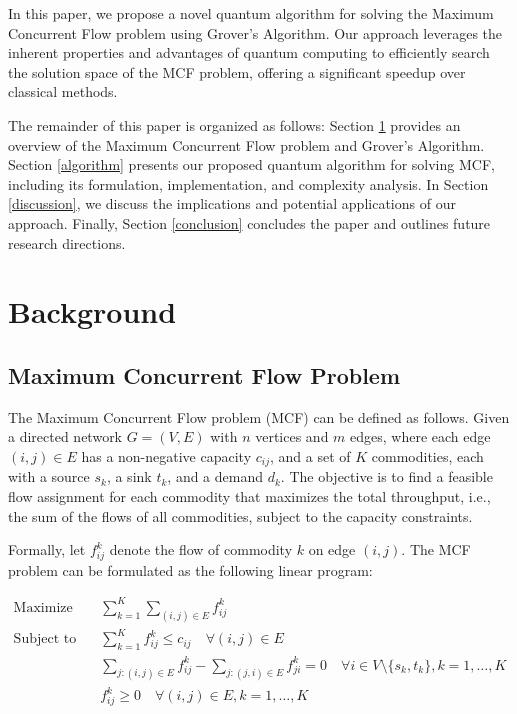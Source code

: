 In this paper, we propose a novel quantum algorithm for solving the Maximum Concurrent Flow problem using Grover's Algorithm. Our approach leverages the inherent properties and advantages of quantum computing to efficiently search the solution space of the MCF problem, offering a significant speedup over classical methods.

The remainder of this paper is organized as follows: Section \ref{background} provides an overview of the Maximum Concurrent Flow problem and Grover's Algorithm. Section \ref{algorithm} presents our proposed quantum algorithm for solving MCF, including its formulation, implementation, and complexity analysis. In Section \ref{discussion}, we discuss the implications and potential applications of our approach. Finally, Section \ref{conclusion} concludes the paper and outlines future research directions.

\section{Background} \label{background}

\subsection{Maximum Concurrent Flow Problem}

The Maximum Concurrent Flow problem (MCF) can be defined as follows. Given a directed network $G=(V, E)$ with $n$ vertices and $m$ edges, where each edge $(i, j) \in E$ has a non-negative capacity $c_{ij}$, and a set of $K$ commodities, each with a source $s_k$, a sink $t_k$, and a demand $d_k$. The objective is to find a feasible flow assignment for each commodity that maximizes the total throughput, i.e., the sum of the flows of all commodities, subject to the capacity constraints.

Formally, let $f_{ij}^k$ denote the flow of commodity $k$ on edge $(i, j)$. The MCF problem can be formulated as the following linear program:

\begin{align}
\text{Maximize} \quad & \sum_{k=1}^{K} \sum_{(i, j) \in E} f_{ij}^k \\
\text{Subject to} \quad & \sum_{k=1}^{K} f_{ij}^k \leq c_{ij} \quad \forall (i, j) \in E \label{cap_constraint} \\
& \sum_{j:(i, j) \in E} f_{ij}^k - \sum_{j:(j, i) \in E} f_{ji}^k = 0 \quad \forall i \in V \setminus \{s_k, t_k\}, k=1, \ldots, K \label{flow_conservation} \\
& f_{ij}^k \geq 0 \quad \forall (i, j) \in E, k=1, \ldots, K
\end{align}

